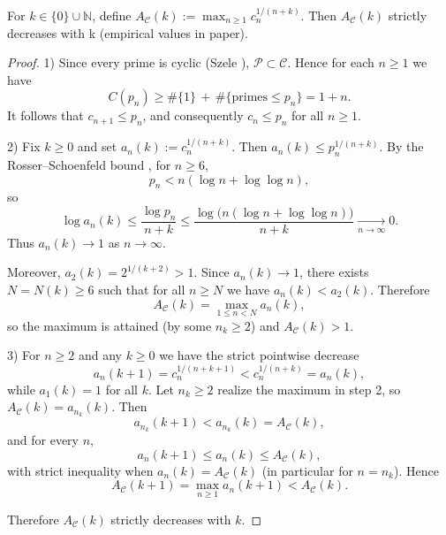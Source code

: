 \begin{theorem}\label{thm:firoozbakht_cyclics_4}
For \(k\in\{0\}\cup\mathbb{N}\), define \(A_{\mathcal{C}}(k):=\max_{n\ge1} c_n^{1/(n+k)}\). Then \(A_{\mathcal{C}}(k)\) strictly decreases with k (empirical values in paper).
\end{theorem}

\begin{proof}
1) Since every prime is cyclic (Szele \cite{Szele1947}), $\mathcal P\subset\mathcal C$. Hence for each $n\ge1$ we have
$$C(p_n)\ge \#\{1\}\,+\,\#\{\text{primes}\le p_n\}=1+n.$$
It follows that $c_{n+1}\le p_n$, and consequently $c_n\le p_n$ for all $n\ge1$.

2) Fix $k\ge0$ and set $a_n(k):=c_n^{1/(n+k)}$. Then $a_n(k)\le p_n^{1/(n+k)}$. By the Rosser--Schoenfeld bound \cite{RosserSchoenfeld1962}, for $n\ge6$,
$$p_n< n(\log n+\log\log n),$$
so
$$\log a_n(k)\le \frac{\log p_n}{n+k}\le \frac{\log\bigl(n(\log n+\log\log n)\bigr)}{n+k}\xrightarrow[n\to\infty]{}0.$$
Thus $a_n(k)\to1$ as $n\to\infty$.

Moreover, $a_2(k)=2^{1/(k+2)}>1$. Since $a_n(k)\to1$, there exists $N=N(k)\ge6$ such that for all $n\ge N$ we have $a_n(k)<a_2(k)$. Therefore
$$A_{\mathcal C}(k)=\max_{1\le n<N} a_n(k),$$
so the maximum is attained (by some $n_k\ge2$) and $A_{\mathcal C}(k)>1$.

3) For $n\ge2$ and any $k\ge0$ we have the strict pointwise decrease
$$a_n(k+1)=c_n^{1/(n+k+1)}<c_n^{1/(n+k)}=a_n(k),$$
while $a_1(k)=1$ for all $k$. Let $n_k\ge2$ realize the maximum in step 2, so $A_{\mathcal C}(k)=a_{n_k}(k)$. Then
$$a_{n_k}(k+1)<a_{n_k}(k)=A_{\mathcal C}(k),$$
and for every $n$,
$$a_n(k+1)\le a_n(k)\le A_{\mathcal C}(k),$$
with strict inequality when $a_n(k)=A_{\mathcal C}(k)$ (in particular for $n=n_k$). Hence
$$A_{\mathcal C}(k+1)=\max_{n\ge1} a_n(k+1)<A_{\mathcal C}(k).$$

Therefore $A_{\mathcal C}(k)$ strictly decreases with $k$. 
\end{proof}
